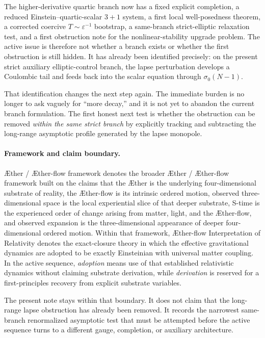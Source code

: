 \documentclass[11pt]{article}
\newcommand{\Aether}{\AE{}ther}
\newcommand{\Aflow}{\AE{}ther-flow}
\newcommand{\TheoryName}{\Aflow{} Interpretation of Relativity}
\newcommand{\TheoryProgram}{\Aether{} / \Aflow{} framework}
\begin{document}
The higher-derivative quartic branch now has a fixed explicit completion, a reduced Einstein--quartic-scalar \(3+1\) system, a first local well-posedness theorem, a corrected coercive \(T\sim \varepsilon^{-1}\) bootstrap, a same-branch strict-elliptic relaxation test, and a first obstruction note for the nonlinear-stability upgrade problem. The active issue is therefore not whether a branch exists or whether the first obstruction is still hidden. It has already been identified precisely: on the present strict auxiliary elliptic-control branch, the lapse perturbation develops a Coulombic tail and feeds back into the scalar equation through \(\sigma_0(N-1)\).

That identification changes the next step again. The immediate burden is no longer to ask vaguely for ``more decay,'' and it is not yet to abandon the current branch formulation. The first honest next test is whether the obstruction can be removed \emph{within the same strict branch} by explicitly tracking and subtracting the long-range asymptotic profile generated by the lapse monopole.

\paragraph{Framework and claim boundary.}
\TheoryProgram{} denotes the broader \Aether{} / \Aflow{} framework built on the claims that the \Aether{} is the underlying four-dimensional substrate of reality, the \Aflow{} is its intrinsic ordered motion, observed three-dimensional space is the local experiential slice of that deeper substrate, S-time is the experienced order of change arising from matter, light, and the \Aflow{}, and observed expansion is the three-dimensional appearance of deeper four-dimensional ordered motion. Within that framework, \TheoryName{} denotes the exact-closure theory in which the effective gravitational dynamics are adopted to be exactly Einsteinian with universal matter coupling. In the active sequence, \emph{adoption} means use of that established relativistic dynamics without claiming substrate derivation, while \emph{derivation} is reserved for a first-principles recovery from explicit substrate variables.

The present note stays within that boundary. It does not claim that the long-range lapse obstruction has already been removed. It records the narrowest same-branch renormalized asymptotic test that must be attempted before the active sequence turns to a different gauge, completion, or auxiliary architecture.
\end{document}
